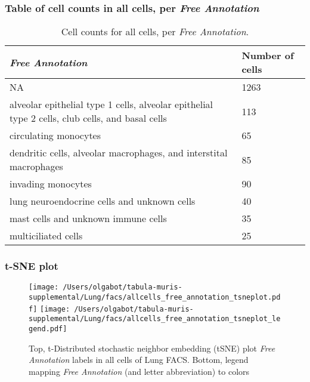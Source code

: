 \subsubsection{Table of cell counts in all cells, per \emph{Free Annotation}}\begin{table}[h]
\centering
\label{my-label}
\begin{tabular}{@{}ll@{}}
\toprule

\emph{Free Annotation}& Number of cells \\ \midrule
NA & 1263 \\

alveolar epithelial type 1 cells, alveolar epithelial type 2 cells, club cells, and basal cells & 113 \\

circulating monocytes & 65 \\

dendritic cells, alveolar macrophages, and interstital macrophages & 85 \\

invading monocytes & 90 \\

lung neuroendocrine cells and unknown cells & 40 \\

mast cells and unknown immune cells & 35 \\

multiciliated cells & 25 \\
\bottomrule
\end{tabular}
\caption{Cell counts for all cells, per \emph{Free Annotation}.}
\end{table}

\clearpage
\subsubsection{t-SNE plot}
\begin{figure}[h]
\centering
\texttt{[image: /Users/olgabot/tabula-muris-supplemental/Lung/facs/allcells\_free\_annotation\_tsneplot.pdf]}
\texttt{[image: /Users/olgabot/tabula-muris-supplemental/Lung/facs/allcells\_free\_annotation\_tsneplot\_legend.pdf]}
\caption{Top, t-Distributed stochastic neighbor embedding (tSNE) plot  \emph{Free Annotation} labels in all cells of Lung FACS. Bottom, legend mapping \emph{Free Annotation} (and letter abbreviation) to colors}
\end{figure}


\clearpage

